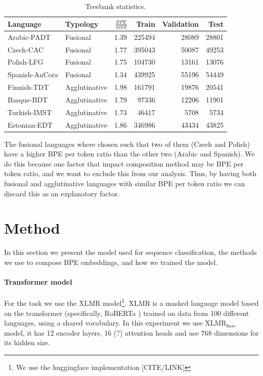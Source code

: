 \documentclass[11pt]{article}
\begin{document}
    	\begin{table}[h]
		\centering
		\begin{tabular}{l|lrrrr}
			Language & Typology & $\frac{BPE}{word}$ & Train & Validation & Test \\
			\hline
			Arabic-PADT  & Fusional & 1.39 & 225494 & 28089 & 28801  \\
			Czech-CAC   & Fusional & 1.77 & 395043 & 50087 & 49253 \\
			Polish-LFG & Fusional & 1.75 & 104730 & 13161 & 13076 \\
			Spanish-AnCora & Fusional & 1.34 & 439925 & 55196 & 54449 \\
			Finnish-TDT & Agglutinative & 1.98 & 161791 & 19876 & 20541 \\
			Basque-BDT  & Agglutinative & 1.79 & 97336 & 12206 & 11901 \\
			Turkish-IMST & Agglutinative & 1.73 & 46417 & 5708 & 5734 \\
			Estonian-EDT & Agglutinative & 1.86 & 346986 & 43434 & 43825 \\
		\end{tabular}
		\caption{\label{tab:data} Treebank statistics.}
	\end{table}
    
    The fusional languages where chosen such that two of them (Czech and Polish) have a higher BPE per token ratio than the other two (Arabic and Spanish). We do this because one factor that impact composition method may be BPE per token ratio, and we want to exclude this from our analysis. Thus, by having both fusional and agglutinative languages with similar BPE per token ratio we can discard this as an explanatory factor. 
    

	
	\section{Method}
	\label{method}
	
	In this section we present the model used for sequence classification, the methods we use to compose BPE embeddings, and how we trained the model.
	
	
	\paragraph{Transformer model}
	For the task we use the XLMR \citep{conneau2019unsupervised} model\footnote{We use the huggingface implementation [CITE/LINK]}. XLMR is a masked language model based on the transformer (specifically, RoBERTa \citep{liu2019roberta}) trained on data from 100 different languages, using a shared vocabulary. In this experiment we use \textsc{XLMR}$_{base}$ model, it has 12 encoder layers, 16 (?) attention heads and use 768 dimensions for its hidden size. 
	
\end{document}
